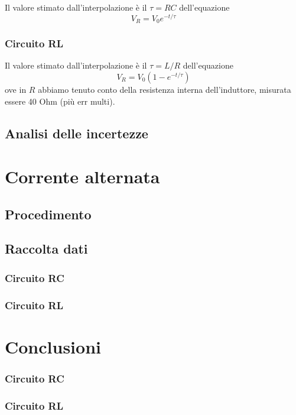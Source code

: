 Il valore stimato dall'interpolazione è il $\tau=RC$ dell'equazione
$$V_R = V_0 e^{-t/\tau}$$

\subsubsection{Circuito RL}

Il valore stimato dall'interpolazione è il $\tau=L/R$ dell'equazione
$$V_R = V_0 (1-e^{-t/\tau})$$
ove in $R$ abbiamo tenuto conto della resistenza interna dell'induttore, misurata essere 40 Ohm (più err multi).


\subsection{Analisi delle incertezze}


\section{Corrente alternata}
\subsection{Procedimento}
\subsection{Raccolta dati}
\subsubsection{Circuito RC}
\subsubsection{Circuito RL}

\section{Conclusioni}
\subsubsection{Circuito RC}
\subsubsection{Circuito RL}
